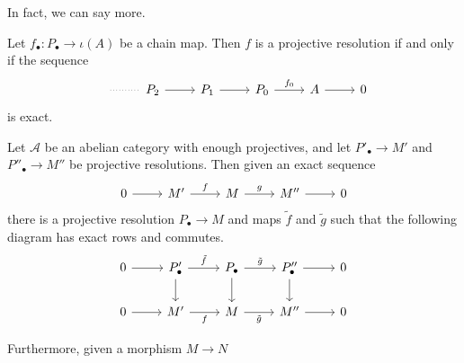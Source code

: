 \documentclass[main.tex]{subfiles}
\begin{document}
In fact, we can say more.

\begin{lemma}
  \label{lemma:equivalent_characterization_of_projective_resolution}
  Let $f_{\bullet}\colon P_{\bullet} \to \iota(A)$ be a chain map. Then $f$ is a projective resolution if and only if the sequence
  \begin{equation*}
    \begin{tikzcd}
      \
      \arrow[r, dotted, no head]
      & P_{2}
      \arrow[r]
      & P_{1}
      \arrow[r]
      & P_{0}
      \arrow[r, "f_{0}"]
      & A
      \arrow[r]
      & 0
    \end{tikzcd}
  \end{equation*}
  is exact.
\end{lemma}

\begin{theorem}
  \label{thm:extended_horseshoe_lemma}
  Let $\mathcal{A}$ be an abelian category with enough projectives, and let $P'_{\bullet} \to M'$ and $P''_{\bullet} \to M''$ be projective resolutions. Then given an exact sequence
  \begin{equation*}
    \begin{tikzcd}
      0
      \arrow[r]
      & M'
      \arrow[r, "f"]
      & M
      \arrow[r, "g"]
      & M''
      \arrow[r]
      & 0
    \end{tikzcd}
  \end{equation*}
  there is a projective resolution $P_{\bullet} \to M$ and maps $\tilde{f}$ and $\tilde{g}$ such that the following diagram has exact rows and commutes.
  \begin{equation*}
    \begin{tikzcd}
      0
      \arrow[r]
      & P'_{\bullet}
      \arrow[r, "\tilde{f}"]
      \arrow[d]
      & P_{\bullet}
      \arrow[r, "\tilde{g}"]
      \arrow[d]
      & P''_{\bullet}
      \arrow[r]
      \arrow[d]
      & 0
      \\
      0
      \arrow[r]
      & M'
      \arrow[r, swap, "f"]
      & M
      \arrow[r, swap, "\tilde{g}"]
      & M''
      \arrow[r]
      & 0
    \end{tikzcd}
  \end{equation*}

  Furthermore, given a morphism $M \to N$
\end{theorem}
\end{document}
